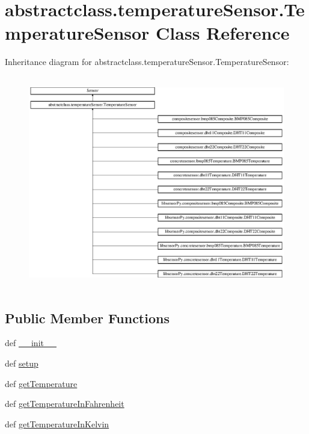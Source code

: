 \hypertarget{classabstractclass_1_1temperatureSensor_1_1TemperatureSensor}{}\section{abstractclass.\+temperature\+Sensor.\+Temperature\+Sensor Class Reference}
\label{classabstractclass_1_1temperatureSensor_1_1TemperatureSensor}
Inheritance diagram for abstractclass.\+temperature\+Sensor.\+Temperature\+Sensor\+:\begin{figure}[H]
\begin{center}
\leavevmode
\includegraphics[height=9.333334cm]{classabstractclass_1_1temperatureSensor_1_1TemperatureSensor}
\end{center}
\end{figure}
\subsection*{Public Member Functions}
\begin{DoxyCompactItemize}
\item 
def \hyperlink{classabstractclass_1_1temperatureSensor_1_1TemperatureSensor_acdd6ff4d1b19f6f0e09f16ed5f093f19}{\+\_\+\+\_\+init\+\_\+\+\_\+}
\item 
def \hyperlink{classabstractclass_1_1temperatureSensor_1_1TemperatureSensor_a80bd6e143d8c041e8764fca54abc6bee}{setup}
\item 
def \hyperlink{classabstractclass_1_1temperatureSensor_1_1TemperatureSensor_a6f297267b7582ebdc11c5adcc50bdd5d}{get\+Temperature}
\item 
def \hyperlink{classabstractclass_1_1temperatureSensor_1_1TemperatureSensor_afb763e9d3cc19c968681ae6b3809c7bf}{get\+Temperature\+In\+Fahrenheit}
\item 
def \hyperlink{classabstractclass_1_1temperatureSensor_1_1TemperatureSensor_a6da9243e7686eeeafb41007263b85247}{get\+Temperature\+In\+Kelvin}
\end{DoxyCompactItemize}
